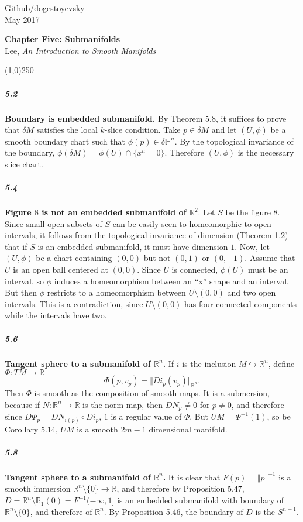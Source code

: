 \documentclass[10pt,letter]{article}
\begin{document}
\noindent Github/dogestoyevsky \\
May 2017
\begin{center}
\textbf{Chapter Five: Submanifolds}\\ Lee, \textit{An Introduction to Smooth Manifolds}

\line(1,0){250}
\end{center}

\subparagraph{5.2} {\bf Boundary is embedded submanifold.} By Theorem 5.8, it suffices to prove that $\delta M$ satisfies the local $k$-slice condition. Take $p \in \delta M$ and let $(U,\phi)$ be a smooth boundary chart such that $\phi(p) \in \delta \mathbb{H}^n$. By the topological invariance of the boundary, $\phi(\delta M) = \phi(U) \cap \lbrace x^n = 0 \rbrace$. Therefore $(U,\phi)$ is the necessary slice chart.

\subparagraph{5.4} {\bf Figure $8$ is not an embedded submanifold of $\mathbb{R}^2$}. Let $S$ be the figure $8$.  Since small open subsets of $S$ can be easily seen to homeomorphic to open intervals, it follows from the topological invariance of dimension (Theorem 1.2) that if $S$ is an embedded submanifold, it must have dimension $1$. Now, let $(U,\phi)$ be a chart containing $(0,0)$ but not $(0,1)$ or $(0,-1)$. Assume that $U$ is an open ball centered at $(0,0)$. Since $U$ is connected, $\phi(U)$ must be an interval, so $\phi$ induces a homeomorphism between an ``x'' shape and an interval. But then $\phi$ restricts to a homeomorphism between $U \setminus (0,0)$ and two open intervals. This is a contradiction, since $U \setminus (0,0)$ has four connected components while the intervals have two. 

\subparagraph{5.6} {\bf Tangent sphere to a submanifold of $\mathbb{R}^n$.} If $i$ is the inclusion $M \hookrightarrow \mathbb{R}^n$, define $\Phi: TM \rightarrow \mathbb{R}$
\[
\Phi(p,v_p) = \Vert Di_p(v_p) \Vert_{\mathbb{R}^n}.
\]
Then $\Phi$ is smooth as the composition of smooth maps. It is a submersion, because if $N: \mathbb{R}^n \rightarrow \mathbb{R}$ is the norm map, then $DN_p \neq 0$ for $p \neq 0$, and therefore since $D\Phi_p = DN_{i(p)} \circ Di_p$, $1$ is a regular value of $\Phi$. But $UM = \Phi^{-1}(1)$, so be Corollary 5.14, $UM$ is a smooth $2m-1$ dimensional manifold. 

\subparagraph{5.8} {\bf Tangent sphere to a submanifold of $\mathbb{R}^n$.} It is clear that $F(p) = \Vert p \Vert^{-1}$ is a smooth immersion $\mathbb{R}^n \setminus \lbrace 0 \rbrace \rightarrow \mathbb{R}$, and therefore by Proposition 5.47, $D = \mathbb{R}^n \setminus \mathbb{B}_1(0) = F^{-1}(-\infty,1]$ is an embedded submanifold with boundary of $\mathbb{R}^n \setminus \lbrace 0 \rbrace$, and therefore of $\mathbb{R}^n$. By Proposition 5.46, the boundary of $D$ is the $S^{n-1}$. 
\end{document}
